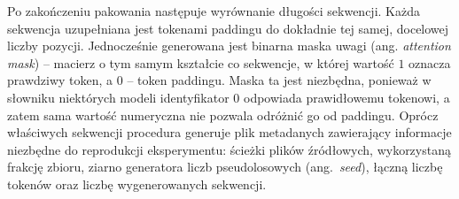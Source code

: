   Po zakończeniu pakowania następuje wyrównanie długości sekwencji. Każda sekwencja uzupełniana jest tokenami paddingu do dokładnie tej samej, docelowej liczby pozycji. Jednocześnie generowana jest binarna maska uwagi (ang. \textit{attention mask}) -- macierz o tym samym kształcie co sekwencje, w której wartość $1$ oznacza prawdziwy token, a $0$ -- token paddingu. Maska ta jest niezbędna, ponieważ w słowniku niektórych modeli identyfikator $0$ odpowiada prawidłowemu tokenowi, a zatem sama wartość numeryczna nie pozwala odróżnić go od paddingu. \newline
  Oprócz właściwych sekwencji procedura generuje plik metadanych zawierający informacje niezbędne do reprodukcji eksperymentu: ścieżki plików źródłowych, wykorzystaną frakcję zbioru, ziarno generatora liczb pseudolosowych (ang.\ \textit{seed}), łączną liczbę tokenów oraz liczbę wygenerowanych sekwencji.

